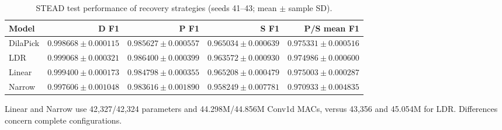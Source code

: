 \begin{table}[t]\centering\small
\caption{STEAD test performance of recovery strategies (seeds 41--43; mean $\pm$ sample SD).}\label{tab:recovery}
\setlength{\tabcolsep}{5pt}
\begin{tabular*}{\textwidth}{@{\extracolsep{\fill}}lrrrr@{}}\toprule Model & D F1 & P F1 & S F1 & P/S mean F1\\\midrule
DilaPick & $0.998668\pm0.000115$ & $0.985627\pm0.000557$ & $0.965034\pm0.000639$ & $0.975331\pm0.000516$\\
LDR & $0.999068\pm0.000321$ & $0.986400\pm0.000399$ & $0.963572\pm0.000930$ & $0.974986\pm0.000600$\\
Linear & $0.999400\pm0.000173$ & $0.984798\pm0.000355$ & $0.965208\pm0.000479$ & $0.975003\pm0.000287$\\
Narrow & $0.997606\pm0.001048$ & $0.983616\pm0.001890$ & $0.958249\pm0.007781$ & $0.970933\pm0.004835$\\
\bottomrule\end{tabular*}\par\vspace{3pt}
\parbox{\textwidth}{\footnotesize Linear and Narrow use 42,327/42,324 parameters and 44.298M/44.856M Conv1d MACs, versus 43,356 and 45.054M for LDR. Differences concern complete configurations.}\end{table}
